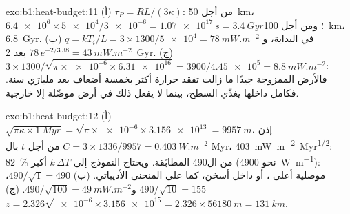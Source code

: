 \begin{solution}{exo:b1:heat-budget:11}
(أ) $\tau_P = RL/(3\kappa)$: من أجل \qty{50}{km}، $\num{6.4e6}\times\num{5e4}/\num{3e-6}
= \qty{1.07e17}{s} = \qty{3.4}{Gyr}$؛ ومن أجل \qty{100}{km}، \qty{6.8}{Gyr}.
(ب) $q = kT_i/L = 3\times1300/\num{5e4} = \qty{78}{mW.m^{-2}}$ في البداية،
و$78\,e^{-2/3.38} = \qty{43}{mW.m^{-2}}$ بعد \qty{2}{Gyr}. (ج)
$3\times1300/\sqrt{\pi\times\num{e-6}\times\num{6.31e16}} = 3900/\num{4.45e5} =
\qty{8.8}{mW.m^{-2}}$: فالأرض الممزوجة جيدًا ما زالت تفقد حرارة أكثر بخمسة أضعاف بعد مليارَي سنة. فكامل داخلها يغذّي السطح، بينما لا يفعل ذلك في أرض موصِّلة إلا  خارجية.
\end{solution}

\begin{solution}{exo:b1:heat-budget:12}
(أ) $\sqrt{\pi\kappa\times\qty{1}{Myr}} = \sqrt{\pi\times\num{e-6}\times\num{3.156e13}}
= \qty{9957}{m}$، إذن $C = 3\times1336/9957 = \qty{0.403}{W.m^{-2}}$ من أجل
$t$ بال Myr، \qty{403}{mW.m^{-2}.Myr^{1/2}}: \qty{82}{\percent} من ال\num{490} المطابَقة. ويحتاج النموذج إلى $k\,\Delta T$ أكبر (نحو \qty{4900}{W.m^{-1}}): موصلية أعلى ، أو داخل أسخن، كما على المنحنى الأديباتي.
(ب) $490/\sqrt1 = 490$، $490/\sqrt{10} = 155$ و$490/\sqrt{100} =
\qty{49}{mW.m^{-2}}$. (ج) $z = 2.326\sqrt{\num{e-6}\times\num{3.156e15}} =
2.326\times\qty{56180}{m} = \qty{131}{km}$.
\end{solution}

